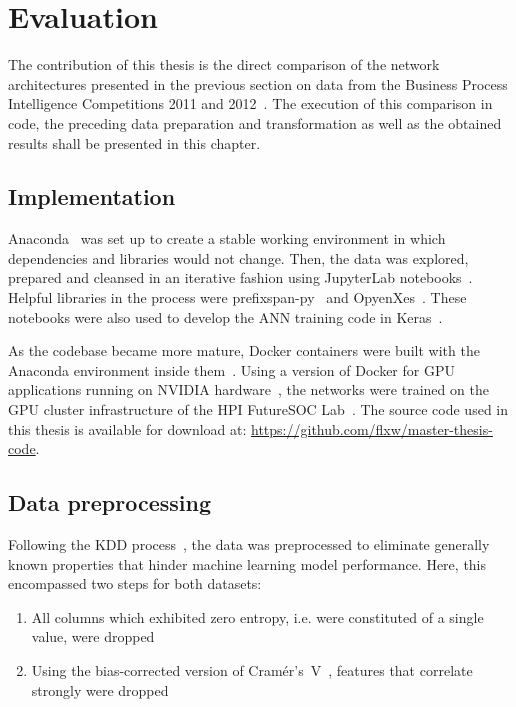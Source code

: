 \chapter{Evaluation}\label{chap:evaluation}
The contribution of this thesis is the direct comparison of the network architectures presented in the previous section on data from the Business Process Intelligence Competitions 2011 and 2012~\cite{BPIC2011, BPIC2012}. The execution of this comparison in code, the preceding data preparation and transformation as well as the obtained results shall be presented in this chapter.

\section{Implementation}
Anaconda~\cite{web:anaconda} was set up to create a stable working environment in which dependencies and libraries would not change.
Then, the data was explored, prepared and cleansed in an iterative fashion using JupyterLab notebooks~\cite{web:jupyter}. Helpful libraries in the process were prefixspan-py~\cite{web:prefixspan-py} and OpyenXes~\cite{web:opyenxes}. These notebooks were also used to develop the ANN training code in Keras~\cite{web:keras}.

As the codebase became more mature, Docker containers were built with the Anaconda environment inside them~\cite{web:docker}. Using a version of Docker for GPU applications running on NVIDIA hardware~\cite{web:nvidia-docker}, the networks were trained on the GPU cluster infrastructure of the HPI FutureSOC Lab~\cite{web:fsoc}.
The source code used in this thesis is available for download at: \url{https://github.com/flxw/master-thesis-code}.

\section{Data preprocessing}
Following the KDD process~\cite{fayyad1996data}, the data was preprocessed to eliminate generally known properties that hinder machine learning model performance. Here, this encompassed two steps for both datasets:

\begin{enumerate}
    \item All columns which exhibited zero entropy, i.e. were constituted of a single value, were dropped
    \item Using the bias-corrected version of Cramér's~V~\cite{bergsma2013bias}, features that correlate strongly were dropped
\end{enumerate}


